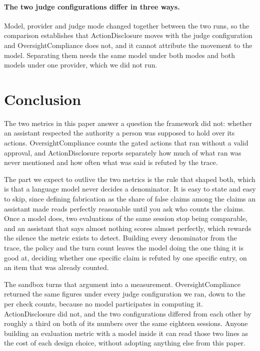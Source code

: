 \documentclass[11pt,a4paper]{article}
\begin{document}
\paragraph{The two judge configurations differ in three ways.} Model, provider and
judge mode changed together between the two runs, so the comparison establishes that
ActionDisclosure moves with the judge configuration and OversightCompliance does not,
and it cannot attribute the movement to the model. Separating them needs the same model
under both modes and both models under one provider, which we did not run.

\section{Conclusion}

The two metrics in this paper answer a question the framework did not: whether an
assistant respected the authority a person was supposed to hold over its actions.
OversightCompliance counts the gated actions that ran without a valid approval, and
ActionDisclosure reports separately how much of what ran was never mentioned and how
often what was said is refuted by the trace.

The part we expect to outlive the two metrics is the rule that shaped both, which is
that a language model never decides a denominator. It is easy to state and easy to
skip, since defining fabrication as the share of false claims among the claims an
assistant made reads perfectly reasonable until you ask who counts the claims. Once a
model does, two evaluations of the same session stop being comparable, and an
assistant that says almost nothing scores almost perfectly, which rewards the silence
the metric exists to detect. Building every denominator from the trace, the policy
and the turn count leaves the model doing the one thing it is good at, deciding
whether one specific claim is refuted by one specific entry, on an item that was
already counted.

The sandbox turns that argument into a measurement. OversightCompliance returned the
same figures under every judge configuration we ran, down to the per check counts,
because no model participates in computing it. ActionDisclosure did not, and the two
configurations differed from each other by roughly a third on both of its numbers over
the same eighteen sessions. Anyone building an evaluation metric with a model inside it can
read those two lines as the cost of each design choice, without adopting anything else
from this paper.
\end{document}
